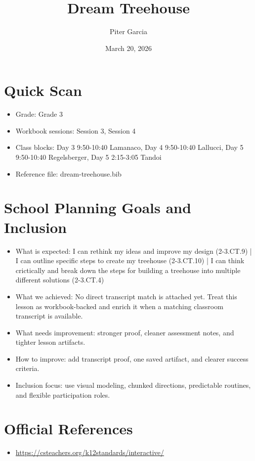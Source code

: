 \documentclass[11pt]{article}
\title{Dream Treehouse}
\author{Piter Garcia}
\date{March 20, 2026}
\begin{document}
\maketitle
\section*{Quick Scan}
\begin{itemize}[leftmargin=*]
\item Grade: Grade 3
\item Workbook sessions: Session 3, Session 4
\item Class blocks: Day 3 9:50-10:40 Lamanaco, Day 4 9:50-10:40 Lallucci, Day 5 9:50-10:40 Regelsberger, Day 5 2:15-3:05 Tandoi
\item Reference file: dream-treehouse.bib
\end{itemize}
\section*{School Planning Goals and Inclusion}
\begin{itemize}[leftmargin=*]
\item What is expected: I can rethink my ideas and improve my design (2-3.CT.9) | I can outline specific steps to create my treehouse (2-3.CT.10) | I can think crictically and break down the steps for building a treehouse into multiple different solutions (2-3.CT.4)
\item What we achieved: No direct transcript match is attached yet. Treat this lesson as workbook-backed and enrich it when a matching classroom transcript is available.
\item What needs improvement: stronger proof, cleaner assessment notes, and tighter lesson artifacts.
\item How to improve: add transcript proof, one saved artifact, and clearer success criteria.
\item Inclusion focus: use visual modeling, chunked directions, predictable routines, and flexible participation roles.
\end{itemize}
\section*{Official References}
\begin{itemize}[leftmargin=*]
\item \url{https://csteachers.org/k12standards/interactive/}

\end{itemize}
\end{document}
